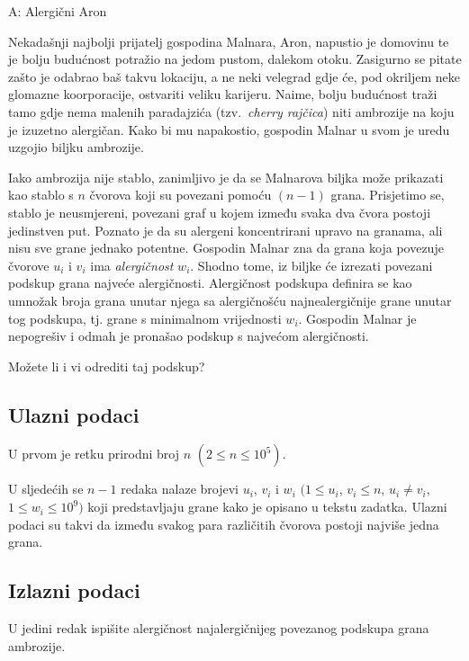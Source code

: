 \begin{statement}[
  timelimit=1 s,
  memorylimit=512 MiB,
]{A: Alergični Aron}

Nekadašnji najbolji prijatelj gospodina Malnara, Aron, napustio je domovinu te
je bolju budućnost potražio na jedom pustom, dalekom otoku. Zasigurno se pitate
zašto je odabrao baš takvu lokaciju, a ne neki velegrad gdje će, pod okriljem
neke glomazne koorporacije, ostvariti veliku karijeru. Naime, bolju budućnost
traži tamo gdje nema malenih paradajzića (tzv.\ \textit{cherry rajčica}) niti
ambrozije na koju je izuzetno alergičan. Kako bi mu napakostio, gospodin Malnar
u svom je uredu uzgojio biljku ambrozije.

Iako ambrozija nije stablo, zanimljivo je da se Malnarova biljka može prikazati
kao stablo s $n$ čvorova koji su povezani pomoću $(n-1)$ grana. Prisjetimo se,
stablo je neusmjereni, povezani graf u kojem između svaka dva čvora postoji
jedinstven put. Poznato je da su
alergeni koncentrirani upravo na granama, ali nisu sve grane jednako potentne.
Gospodin Malnar zna da grana koja povezuje čvorove $u_i$ i $v_i$ ima
\textit{alergičnost} $w_i$. Shodno tome, iz biljke će izrezati povezani podskup
grana najveće alergičnosti. Alergičnost podskupa definira se kao umnožak broja
grana unutar njega sa alergičnošću najnealergičnije grane unutar tog podskupa,
tj. grane s minimalnom vrijednosti $w_i$. Gospodin Malnar je nepogrešiv i odmah
je pronašao podskup s najvećom alergičnosti.

Možete li i vi odrediti taj podskup?

\subsection*{Ulazni podaci}
U prvom je retku prirodni broj $n$ $(2 \le n \le 10^5)$.

U sljedećih se $n-1$ redaka nalaze brojevi $u_i$, $v_i$ i $w_i$
$(1 \le u_i$, $v_i \le n$, $u_i \neq v_i$, $1 \le w_i \le 10^9)$ koji
predstavljaju grane kako je opisano u tekstu zadatka. Ulazni podaci su
takvi da između svakog para različitih čvorova postoji najviše jedna
grana.

\subsection*{Izlazni podaci}
U jedini redak ispišite alergičnost najalergičnijeg povezanog podskupa
grana ambrozije.


\end{statement}
